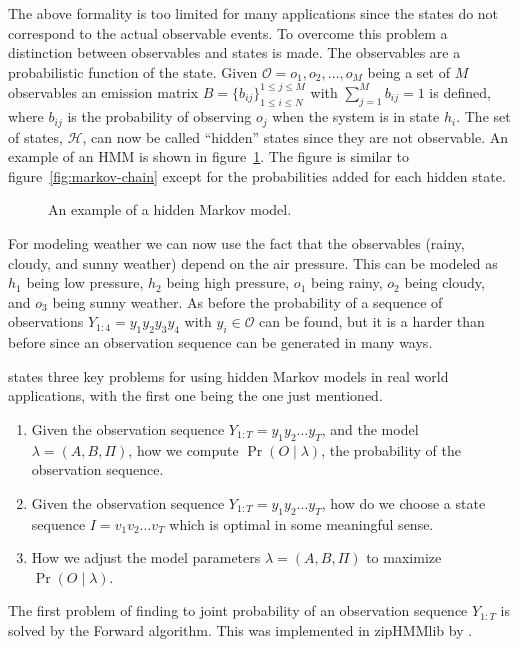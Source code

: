 The above formality is too limited for many applications since the states do
not correspond to the actual observable events. To overcome this problem a
distinction between observables and states is made. The observables are a
probabilistic function of the state. Given
$\mathcal{O} = {o_1, o_2, \dots, o_M}$ being a set of $M$ observables an
emission matrix $B = {\{b_{ij}\}}_{1 \le i \le N}^{1 \le j \le M}$ with
$\sum_{j=1}^M b_{ij} = 1$ is defined, where $b_{ij}$ is the probability of
observing $o_j$ when the system is in state $h_i$. The set of states,
$\mathcal{H}$, can now be called ``hidden'' states since they are not
observable. An example of an HMM is shown in
figure~\ref{fig:hidden-markov-model}. The figure is similar to
figure~\ref{fig:markov-chain} except for the probabilities added for each
hidden state.

\begin{figure}
  \centering
  
  \caption{An example of a hidden Markov model.}
  \label{fig:hidden-markov-model}
\end{figure}

For modeling weather we can now use the fact that the observables (rainy,
cloudy, and sunny weather) depend on the air pressure. This can be modeled as
$h_1$ being low pressure, $h_2$ being high pressure, $o_1$ being rainy, $o_2$
being cloudy, and $o_3$ being sunny weather. As before the probability of a
sequence of observations $Y_{1:4} = y_1y_2y_3y_4$ with $y_i \in \mathcal{O}$
can be found, but it is a harder than before since an observation sequence can be
generated in many ways.

\citet{rabiner1989tutorial} states three key problems for using hidden Markov
models in real world applications, with the first one being the one just
mentioned.
\begin{enumerate}
\item Given the observation sequence $Y_{1:T} = y_1y_2\dots{}y_T$, and the
  model $\lambda = (A, B, \Pi)$, how we compute $\Pr(O \mid \lambda)$, the
  probability of the observation sequence.
\item Given the observation sequence $Y_{1:T} = y_1y_2\dots{}y_T$, how do we
  choose a state sequence $I = v_1v_2\dots{}v_T$ which is optimal in some
  meaningful sense.
\item How we adjust the model parameters $\lambda = (A, B, \Pi)$ to maximize
  $\Pr(O \mid \lambda)$.
\end{enumerate}

The first problem of finding to joint probability of an observation sequence
$Y_{1:T}$ is solved by the Forward algorithm. This was implemented in zipHMMlib
by \citet{sand2013ziphmmlib}.

